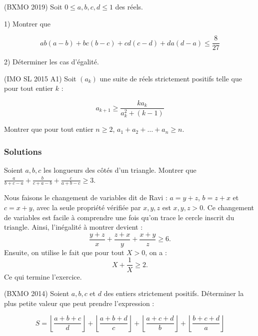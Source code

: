 \begin{exo}
(BXMO 2019) Soit $0\leqslant a,b,c,d\leqslant 1$ des réels.

1) Montrer que

\[ab(a-b)+bc(b-c)+cd(c-d)+da(d-a) \leqslant \frac{8}{27}\]

2) Déterminer les cas d'égalité.
\end{exo}




\begin{exo}
(IMO SL 2015 A1)
Soit $(a_k)$ une suite de réels strictement positifs telle que pour tout entier $k$ :

\[a_{k+1} \geqslant \frac{ka_k}{a_k^2 +(k-1)}\]

Montrer que pour tout entier $n\geqslant 2$, $a_1+a_2+\ldots +a_n \geqslant n$.
\end{exo}



\subsubsection{Solutions}

\setcounter{exo}{0}
\begin{exo}
Soient $a,b,c$ les longueurs des côtés d'un triangle. Montrer que $\frac{a}{b+c-a}+\frac{b}{c+a-b}+\frac{c}{a+b-c} \geq 3$.
\end{exo}

\begin{sol}
Nous faisons le changement de variables dit de Ravi : $a=y+z$, $b=z+x$ et $c=x+y$, avec la seule propriété vérifiée par $x,y,z$ est $x,y,z>0$. Ce changement de variables est facile à comprendre une fois qu'on trace le cercle inscrit du triangle. Ainsi, l'inégalité à montrer devient :
\[
\frac{y+z}{x}+\frac{z+x}{y}+\frac{x+y}{z} \geq 6.
\]
Ensuite, on utilise le fait que pour tout $X>0$, on a :
\[
X+\frac1{X}\geq 2.
\]
Ce qui termine l'exercice.
\end{sol}



\begin{exo}
(BXMO 2014) Soient $a,b,c$ et $d$ des entiers strictement positifs. Déterminer la plus petite valeur que peut prendre l'expression :

\[S=\left\lfloor \frac{a+b+c}{d}\right\rfloor + \left\lfloor \frac{a+b+d}{c}\right\rfloor + \left\lfloor \frac{a+c+d}{b}\right\rfloor +\left\lfloor \frac{b+c+d}{a}\right\rfloor\]
\end{exo}

